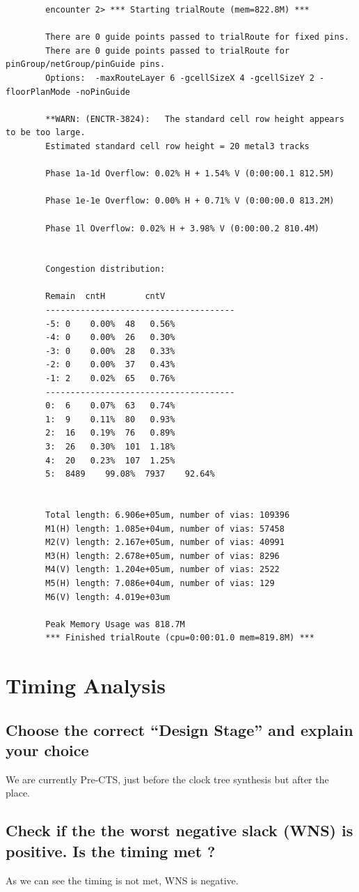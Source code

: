 \documentclass[11pt,a4paper,sans,dvipsnames]{report}
\begin{document}
	\begin{lstlisting}
		encounter 2> *** Starting trialRoute (mem=822.8M) ***

		There are 0 guide points passed to trialRoute for fixed pins.
		There are 0 guide points passed to trialRoute for pinGroup/netGroup/pinGuide pins.
		Options:  -maxRouteLayer 6 -gcellSizeX 4 -gcellSizeY 2 -floorPlanMode -noPinGuide

		**WARN: (ENCTR-3824):	The standard cell row height appears to be too large.
		Estimated standard cell row height = 20 metal3 tracks

		Phase 1a-1d Overflow: 0.02% H + 1.54% V (0:00:00.1 812.5M)

		Phase 1e-1e Overflow: 0.00% H + 0.71% V (0:00:00.0 813.2M)

		Phase 1l Overflow: 0.02% H + 3.98% V (0:00:00.2 810.4M)


		Congestion distribution:

		Remain	cntH		cntV
		--------------------------------------
		-5:	0	 0.00%	48	 0.56%
		-4:	0	 0.00%	26	 0.30%
		-3:	0	 0.00%	28	 0.33%
		-2:	0	 0.00%	37	 0.43%
		-1:	2	 0.02%	65	 0.76%
		--------------------------------------
		0:	6	 0.07%	63	 0.74%
		1:	9	 0.11%	80	 0.93%
		2:	16	 0.19%	76	 0.89%
		3:	26	 0.30%	101	 1.18%
		4:	20	 0.23%	107	 1.25%
		5:	8489	99.08%	7937	92.64%


		Total length: 6.906e+05um, number of vias: 109396
		M1(H) length: 1.085e+04um, number of vias: 57458
		M2(V) length: 2.167e+05um, number of vias: 40991
		M3(H) length: 2.678e+05um, number of vias: 8296
		M4(V) length: 1.204e+05um, number of vias: 2522
		M5(H) length: 7.086e+04um, number of vias: 129
		M6(V) length: 4.019e+03um

		Peak Memory Usage was 818.7M 
		*** Finished trialRoute (cpu=0:00:01.0 mem=819.8M) ***
	\end{lstlisting}

	\newpage
	\section{Timing Analysis}
	\subsection*{Choose the correct “Design Stage” and explain your choice}
	We are currently Pre-CTS, just before the clock tree synthesis but after the place.

	\subsection*{Check if the the worst negative slack (WNS) is positive. Is the timing met ?}
	As we can see the timing is not met, WNS is negative.
\end{document}
